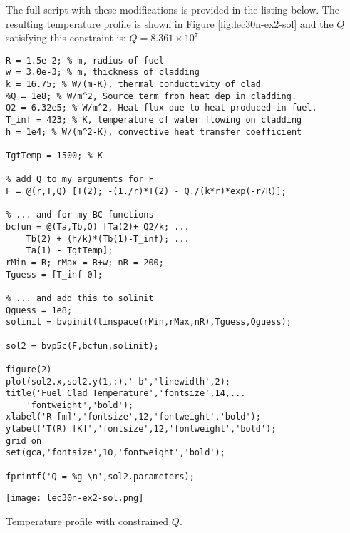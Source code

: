 The full script with these modifications is provided in the listing below. The resulting temperature profile is shown in Figure \ref{fig:lec30n-ex2-sol} and the $Q$ satisfying this constraint is: $Q = 8.361\times 10^{7}$. 

\begin{lstlisting}[style=myMatlab,name=lec30n-ex2]
R = 1.5e-2; % m, radius of fuel
w = 3.0e-3; % m, thickness of cladding
k = 16.75; % W/(m-K), thermal conductivity of clad
%Q = 1e8; % W/m^2, Source term from heat dep in cladding. 
Q2 = 6.32e5; % W/m^2, Heat flux due to heat produced in fuel.
T_inf = 423; % K, temperature of water flowing on cladding
h = 1e4; % W/(m^2-K), convective heat transfer coefficient

TgtTemp = 1500; % K

% add Q to my arguments for F
F = @(r,T,Q) [T(2); -(1./r)*T(2) - Q./(k*r)*exp(-r/R)];

% ... and for my BC functions
bcfun = @(Ta,Tb,Q) [Ta(2)+ Q2/k; ...
    Tb(2) + (h/k)*(Tb(1)-T_inf); ...
    Ta(1) - TgtTemp];
rMin = R; rMax = R+w; nR = 200;
Tguess = [T_inf 0];

% ... and add this to solinit
Qguess = 1e8;
solinit = bvpinit(linspace(rMin,rMax,nR),Tguess,Qguess);

sol2 = bvp5c(F,bcfun,solinit);

figure(2)
plot(sol2.x,sol2.y(1,:),'-b','linewidth',2);
title('Fuel Clad Temperature','fontsize',14,...
    'fontweight','bold');
xlabel('R [m]','fontsize',12,'fontweight','bold');
ylabel('T(R) [K]','fontsize',12,'fontweight','bold');
grid on
set(gca,'fontsize',10,'fontweight','bold');

fprintf('Q = %g \n',sol2.parameters);
\end{lstlisting}
\begin{marginfigure}[-12.0cm]
\texttt{[image: lec30n-ex2-sol.png]}
\caption{Temperature profile with constrained $Q$.}
\label{fig:lec30n-ex2-sol}
\end{marginfigure}
